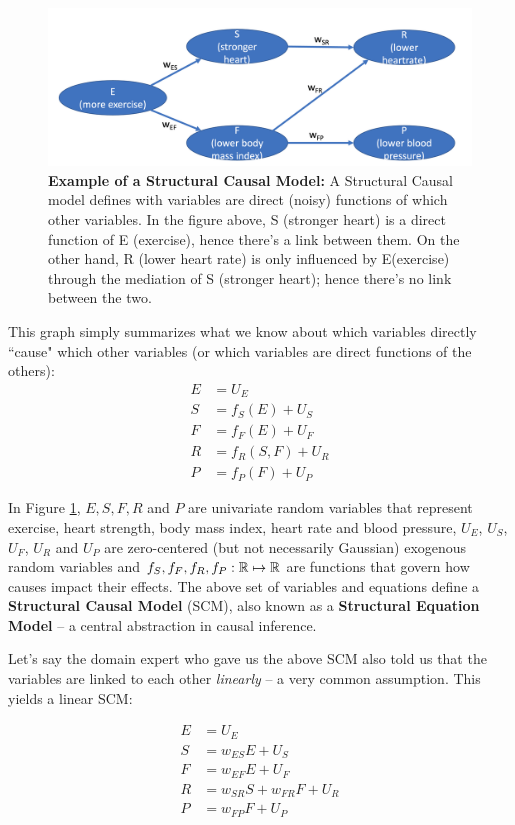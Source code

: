\documentclass[11pt,a4paper]{article}
\begin{document}
\begin{figure}[h]
\center
\includegraphics[width=12cm]{figures/scm_example_2.png}
\caption{\textbf{Example of a Structural Causal Model:} A Structural Causal model defines with variables are direct (noisy) functions of which other variables. In the figure above, S (stronger heart) is a direct function of E (exercise), hence there's a link between them. On the other hand, R (lower heart rate) is only influenced by E(exercise) through the mediation of S (stronger heart); hence there's no link between the two. }
\label{fig:scm_example}
\end{figure}

This graph simply summarizes what we know about which variables directly ``cause" which other variables (or which variables are direct functions of the others):
\begin{align}
    E &= U_{E} \\ 
    S &= f_{S}(E) + U_{S} \\
    F &= f_F(E) + U_{F} \\
    R &= f_R (S, F) + U_{R} \\
    P &= f_P (F) + U_{P}
\end{align}

In Figure \ref{fig:scm_example}, $E, S, F, R$ and $P$ are univariate random variables that represent exercise, heart strength, body mass index, heart rate and blood pressure, $U_E$, $U_S$, $U_F$, $U_R$ and $U_P$ are zero-centered (but not necessarily Gaussian) exogenous random variables and $f_S, f_F, f_R, f_P: \mathbb{R} \mapsto \mathbb{R}$ are functions that govern how causes impact their effects. The above set of variables and equations define a \textbf{Structural Causal Model} (SCM), also known as a \textbf{Structural Equation Model} -- a central abstraction in causal inference. 

Let's say the domain expert who gave us the above SCM also told us that the variables are linked to each other \textit{linearly} -- a very common assumption. This yields a linear SCM:

\begin{align}
    E &= U_{E} \\ 
    S &= w_{ES}E + U_{S} \\
    F &= w_{EF}E + U_{F} \\
    R &= w_{SR}S + w_{FR}F + U_{R} \\
    P &= w_{FP}F + U_{P}
\end{align}
\end{document}

